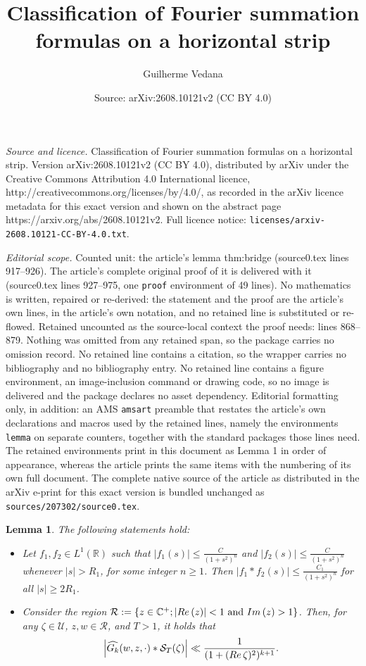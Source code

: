 \documentclass[10pt,a4paper]{amsart}
\title{Classification of Fourier summation formulas on a horizontal strip}
\author{Guilherme Vedana}
\date{Source: arXiv:2608.10121v2 (CC BY 4.0)}
\newtheorem{lemma}{Lemma}
\renewcommand{\Im}{{\rm Im}\,}
\newcommand{\R}{\mathcal{R}}
\renewcommand{\Re}{{\rm Re}\,}
\renewcommand{\S}{\mathcal{S}}
\newcommand{\U}{\mathcal{U}}
\newcommand{\cd}{\cdot}
\newcommand{\cp}{\mathbb{C}} %
\newcommand{\ft}{\widehat}
\renewcommand{\r}{\mathbb{R}}
\begin{document}
\maketitle

\noindent\emph{Source and licence.} Classification of Fourier summation formulas on a horizontal strip. Version arXiv:2608.10121v2 (CC BY 4.0), distributed by arXiv under the Creative Commons Attribution 4.0 International licence, http://creativecommons.org/licenses/by/4.0/, as recorded in the arXiv licence metadata for this exact version and shown on the abstract page https://arxiv.org/abs/2608.10121v2. Full licence notice: \texttt{licenses/arxiv-2608.10121-CC-BY-4.0.txt}.\par\smallskip

\noindent\textit{Editorial scope.} Counted unit: the article's lemma thm:bridge (source0.tex lines 917--926). The article's complete original proof of it is delivered with it (source0.tex lines 927--975, one \texttt{proof} environment of 49 lines). No mathematics is written, repaired or re-derived: the statement and the proof are the article's own lines, in the article's own notation, and no retained line is substituted or re-flowed.  Retained uncounted as the source-local context the proof needs: lines 868--879.  Nothing was omitted from any retained span, so the package carries no omission record.  No retained line contains a citation, so the wrapper carries no bibliography and no bibliography entry.  No retained line contains a figure environment, an image-inclusion command or drawing code, so no image is delivered and the package declares no asset dependency.  Editorial formatting only, in addition: an AMS \texttt{amsart} preamble that restates the article's own declarations and macros used by the retained lines, namely the environments \texttt{lemma} on separate counters, together with the standard packages those lines need.  The retained environments print in this document as Lemma 1 in order of appearance, whereas the article prints the same items with the numbering of its own full document.  The complete native source of the article as distributed in the arXiv e-print for this exact version is bundled unchanged as \texttt{sources/207302/source0.tex}.
\begin{lemma}
    \label{lemma:asymptotic_decay}
    The following statements hold:
    \begin{itemize}
        \item[i)] Let $f_1,f_2\in L^1(\r)$ such that $|f_1(s)|\leq\frac{C}{(1+s^2)^n}$ and $|f_2(s)|\leq\frac{C}{(1+s^2)^n}$ whenever $|s|>R_1$, for some integer $n\geq1$. Then $|f_1*f_2(s)|\leq\frac{C_1}{(1+s^2)^n}$ for all $|s|\geq2R_1$.
        \item[ii)] Consider the region $\R:=\{z\in\cp^+;|\Re(z)|<1 \text{ and } \Im(z)>1\}$. Then, for any $\zeta\in\U$, $z,w\in\R$, and $T>1$, it holds that
        \begin{equation}
        \label{eq:unif_estimate_lemma}
        \left|\ft{G_k}(w,z,\cd)* \S_T(\zeta)\right|\ll\frac{1}{(1+(\Re{\zeta})^2)^{k+1}}.
        \end{equation}
    \end{itemize}
\end{lemma}
\end{document}
